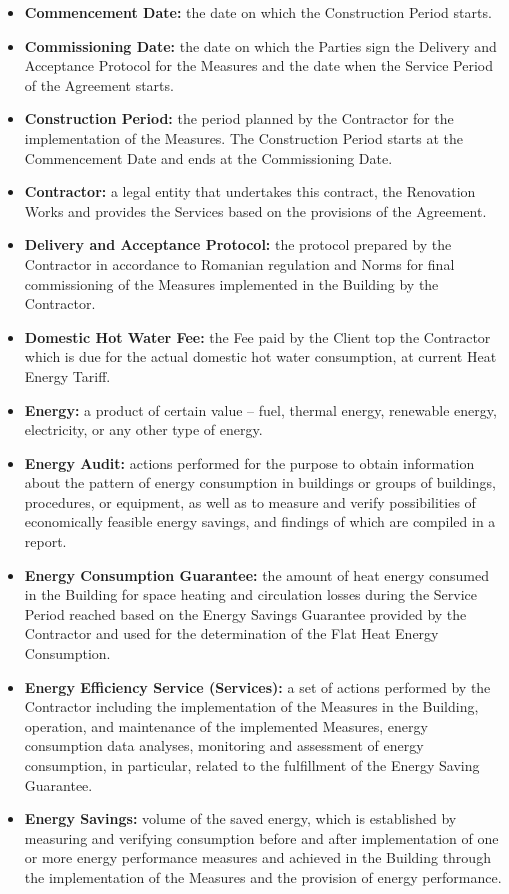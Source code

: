 \begin{multicols}{2}
\begin{itemize}[label={}]
	\item\textbf{Commencement Date:} the date on which the Construction Period starts.
	\item\textbf{Commissioning Date:} the date on which the Parties sign the Delivery and Acceptance Protocol for the Measures and the date when the Service Period of the Agreement starts.
	\item\textbf{Construction Period:} the period planned by the Contractor for the implementation of the Measures. The Construction Period starts at the Commencement Date and ends at the Commissioning Date.
	\item\textbf{Contractor:} a legal entity that undertakes this contract, the Renovation Works and provides the Services based on the provisions of the Agreement.
	\item\textbf{Delivery and Acceptance Protocol:} the protocol prepared by the Contractor in accordance to Romanian regulation and Norms for final commissioning of the Measures implemented in the Building by the Contractor.
	\item\textbf{Domestic Hot Water Fee:} the Fee paid by the Client top the Contractor which is due for the actual domestic hot water consumption, at current Heat Energy Tariff.
	\item\textbf{Energy:} a product of certain value – fuel, thermal energy, renewable energy, electricity, or any other type of energy.
	\item\textbf{Energy Audit:} actions performed for the purpose to obtain information about the pattern of energy consumption in buildings or groups of buildings, procedures, or equipment, as well as to measure and verify possibilities of economically feasible energy savings, and findings of which are compiled in a report.
	\item\textbf{Energy Consumption Guarantee:} the amount of heat energy consumed in the Building for space heating and circulation losses during the Service Period reached based on the Energy Savings Guarantee provided by the Contractor and used for the determination of the Flat Heat Energy Consumption.
	\item\textbf{Energy Efficiency Service (Services):} a set of actions performed by the Contractor including the implementation of the Measures in the Building, operation, and maintenance of the implemented Measures, energy consumption data analyses, monitoring and assessment of energy consumption, in particular, related to the fulfillment of the Energy Saving Guarantee.
	\item\textbf{Energy Savings:} volume of the saved energy, which is established by measuring and verifying consumption before and after implementation of one or more energy performance measures and achieved in the Building through the implementation of the Measures and the provision of energy performance.

\end{itemize}
\end{multicols}
